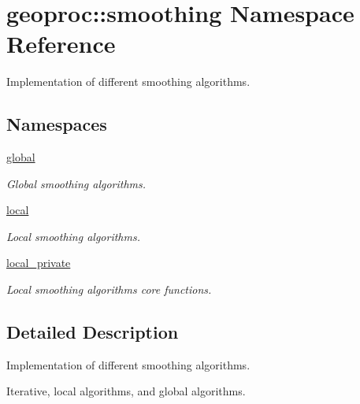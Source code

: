 \hypertarget{namespacegeoproc_1_1smoothing}{}\section{geoproc\+:\+:smoothing Namespace Reference}
\label{namespacegeoproc_1_1smoothing}


Implementation of different smoothing algorithms.  


\subsection*{Namespaces}
\begin{DoxyCompactItemize}
\item 
 \hyperlink{namespacegeoproc_1_1smoothing_1_1global}{global}
\begin{DoxyCompactList}\small\item\em Global smoothing algorithms. \end{DoxyCompactList}\item 
 \hyperlink{namespacegeoproc_1_1smoothing_1_1local}{local}
\begin{DoxyCompactList}\small\item\em Local smoothing algorithms. \end{DoxyCompactList}\item 
 \hyperlink{namespacegeoproc_1_1smoothing_1_1local__private}{local\+\_\+private}
\begin{DoxyCompactList}\small\item\em Local smoothing algorithms core functions. \end{DoxyCompactList}\end{DoxyCompactItemize}


\subsection{Detailed Description}
Implementation of different smoothing algorithms. 

Iterative, local algorithms, and global algorithms. 
